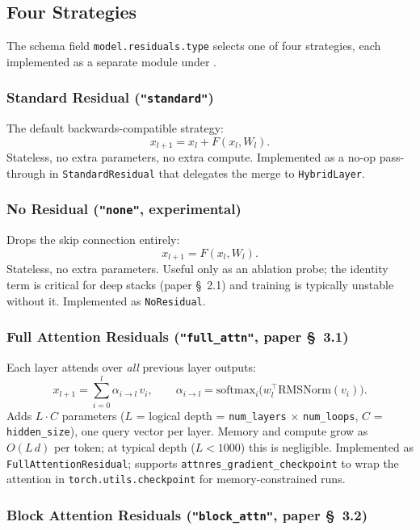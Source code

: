 \subsection{Four Strategies}

The schema field \texttt{model.residuals.type} selects one of four
strategies, each implemented as a separate module under
.

\subsubsection{Standard Residual (\texttt{"standard"})}

The default backwards-compatible strategy:
\[
x_{l+1} = x_l + F(x_l, W_l).
\]
Stateless, no extra parameters, no extra compute. Implemented as a
no-op pass-through in \texttt{StandardResidual} that delegates the
merge to \texttt{HybridLayer}.

\subsubsection{No Residual (\texttt{"none"}, experimental)}

Drops the skip connection entirely:
\[
x_{l+1} = F(x_l, W_l).
\]
Stateless, no extra parameters. Useful only as an ablation probe; the
identity term is critical for deep stacks (paper \S~2.1) and training is
typically unstable without it. Implemented as \texttt{NoResidual}.

\subsubsection{Full Attention Residuals (\texttt{"full\_attn"}, paper \S~3.1)}

Each layer attends over \emph{all} previous layer outputs:
\[
x_{l+1} = \sum_{i=0}^{l} \alpha_{i \to l} \, v_i, \qquad
\alpha_{i \to l} = \mathrm{softmax}_i\!\big(w_l^{\top} \mathrm{RMSNorm}(v_i)\big).
\]
Adds $L \cdot C$ parameters ($L$ = logical depth = \texttt{num\_layers}
$\times$ \texttt{num\_loops}, $C$ = \texttt{hidden\_size}), one query
vector per layer. Memory and compute grow as $O(L \, d)$ per token; at
typical depth ($L < 1000$) this is negligible. Implemented as
\texttt{FullAttentionResidual}; supports
\texttt{attnres\_gradient\_checkpoint} to wrap the attention in
\texttt{torch.utils.checkpoint} for memory-constrained runs.

\subsubsection{Block Attention Residuals (\texttt{"block\_attn"}, paper \S~3.2)}

